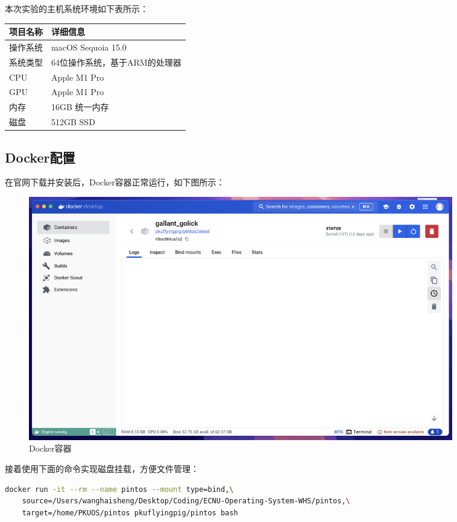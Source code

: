 \documentclass{article}
\begin{document}
本次实验的主机系统环境如下表所示：

\begin{center}
	\begin{tabular}{| >{\centering\arraybackslash}m{3cm} | >{\centering\arraybackslash}m{7cm} |}    
		\hline  
		\textbf{项目名称} & \textbf{详细信息} \\
		\hline  
		操作系统 & macOS Sequoia 15.0 \\  
		\hline  
		系统类型 & 64位操作系统，基于ARM的处理器 \\  
		\hline
		CPU & Apple M1 Pro \\  
		\hline 
		GPU & Apple M1 Pro\\  
		\hline 
		内存 & 16GB 统一内存 \\  
		\hline 
		磁盘 & 512GB SSD \\  
		\hline 		
	\end{tabular}
\end{center}

\subsection{Docker配置}

在官网下载并安装后，Docker容器正常运行，如下图所示：

\begin{figure}[H]
	\centering
	\includegraphics[width=0.9\textwidth]{img/docker_install.png}
	\caption{Docker容器}
\end{figure}

接着使用下面的命令实现磁盘挂载，方便文件管理：

\begin{lstlisting}[language=Bash, title=启动Docker容器并挂载文件]
	docker run -it --rm --name pintos --mount type=bind,\
	source=/Users/wanghaisheng/Desktop/Coding/ECNU-Operating-System-WHS/pintos,\
	target=/home/PKUOS/pintos pkuflyingpig/pintos bash
\end{lstlisting}
\end{document}
